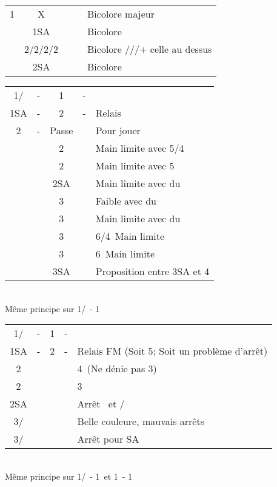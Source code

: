 \documentclass[a4paper, oneside, 11pt]{report}
\begin{document}
	\begin{tabular}{cccc|l}
	1\trefle & X &&& Bicolore majeur\\
	& 1SA &&& Bicolore \coeur\ \trefle\\
	& 2\trefle/2\carreau/2\coeur/2\pique &&& Bicolore \trefle/\carreau/\coeur/\pique + celle au dessus\\
	& 2SA &&& Bicolore \pique\ \carreau
	\end{tabular}

	\begin{tabular}{cccc|l}
	1\trefle/\carreau & - & 1\pique & - &\\
	1SA & - & 2\trefle & - & Relais\\
	2\carreau & - & Passe && Pour jouer\\
	&& 2\coeur && Main limite avec 5\pique/4\coeur\\\
	&& 2\pique && Main limite avec 5\pique\\
	&& 2SA && Main limite avec du \trefle\\
	&& 3\trefle && Faible avec du \trefle\\
	&& 3\carreau && Main limite avec du \carreau\\
	&& 3\coeur && 6\pique/4\coeur\ Main limite\\
	&& 3\pique && 6\pique\ Main limite\\
	&& 3SA && Proposition entre 3SA et 4\pique\\
	\end{tabular}\\
	Même principe sur 1\trefle/\carreau\ - 1\coeur\\

	\begin{tabular}{cccc|l}
	1\trefle/\carreau & - & 1\pique & - &\\
	1SA & - & 2\carreau & - & Relais FM (Soit 5\pique ; Soit un problème d'arrêt)\\
	2\coeur &&&& 4\coeur\ (Ne dénie pas 3\pique)\\
	2\pique &&&& 3\pique\\
	2SA &&&& Arrêt \coeur\ et \carreau/\trefle\\
	3\trefle/\carreau &&&& Belle couleure, mauvais arrêts\\
	3\carreau/\trefle &&&& Arrêt pour SA\\
	\end{tabular}\\
	Même principe sur 1\trefle/\carreau\ - 1\coeur\ et 1\coeur\ - 1\pique\\
\end{document}
